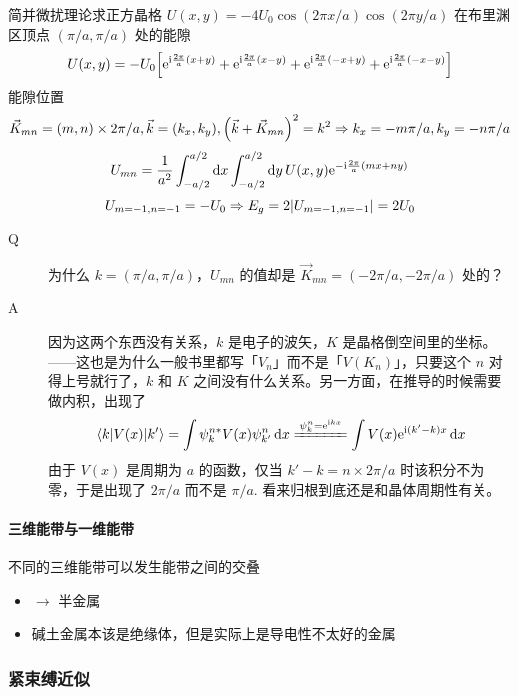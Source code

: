 \begin{framed}
    简并微扰理论求正方晶格 $U(x, y) = - 4 U_0 \cos (2 \pi x / a) \cos (2 \pi y / a)$ 在布里渊区顶点 $(\pi / a, \pi / a)$ 处的能隙
    \[ U(x, y) = - U_0 \qty[\mathrm{e}^{\mathrm{i} \frac{2 \pi}{a} (x + y)} + \mathrm{e}^{\mathrm{i} \frac{2 \pi}{a} (x - y)} + \mathrm{e}^{\mathrm{i} \frac{2 \pi}{a} (- x + y)} + \mathrm{e}^{\mathrm{i} \frac{2 \pi}{a} (- x - y)}] \]
    能隙位置
    \[ \vec{K}_{mn} = \qty(m, n) \times 2 \pi / a, \vec{k} = \qty(k_x, k_y), \qty(\vec{k} + \vec{K}_{mn})^2 = k^2 \Rightarrow k_x = - m \pi / a, k_y = - n \pi / a \]
    \[ U_{m n} = \frac{1}{a^2} \int_{-a/2}^{a/2} \dd{x} \int_{-a/2}^{a/2} \dd{y} U(x, y) \mathrm{e}^{- \mathrm{i} \frac{2 \pi}{a} (m x + n y)} \]
    \[ U_{m = -1, n = -1} = - U_0 \Rightarrow E_g = 2 \qty|U_{m = -1, n = -1}| = 2 U_0 \]
    \begin{description}
        \item[Q] 为什么 $k = (\pi / a, \pi / a)$，$U_{mn}$ 的值却是 $\vec{K}_{mn} = (- 2 \pi / a, - 2 \pi / a)$ 处的？
        \item[A] 因为这两个东西没有关系，$k$ 是电子的波矢，$K$ 是晶格倒空间里的坐标。——这也是为什么一般书里都写「$V_n$」而不是「$V(K_n)$」，只要这个 $n$ 对得上号就行了，$k$ 和 $K$ 之间没有什么关系。另一方面，在推导的时候需要做内积，出现了 \[ \mel{k}{V(x)}{k'} = \int \psi_{k}^{n*} V(x) \psi_{k'}^{n} \dd{x} \xlongequal{\psi_{k}^n = \rme^{\rmi k x}} \int V(x) \rme^{\rmi (k' - k) x} \dd{x} \] 由于 $V(x)$ 是周期为 $a$ 的函数，仅当 $k' - k = n \times 2 \pi / a$ 时该积分不为零，于是出现了 $2 \pi / a$ 而不是 $\pi / a$. 看来归根到底还是和晶体周期性有关。
    \end{description}
\end{framed}

\paragraph{三维能带与一维能带}

不同的三维能带可以发生能带之间的交叠
\begin{itemize}
    \item $\to$ 半金属
    \item 碱土金属本该是绝缘体，但是实际上是导电性不太好的金属
\end{itemize}

\subsubsection{紧束缚近似}

